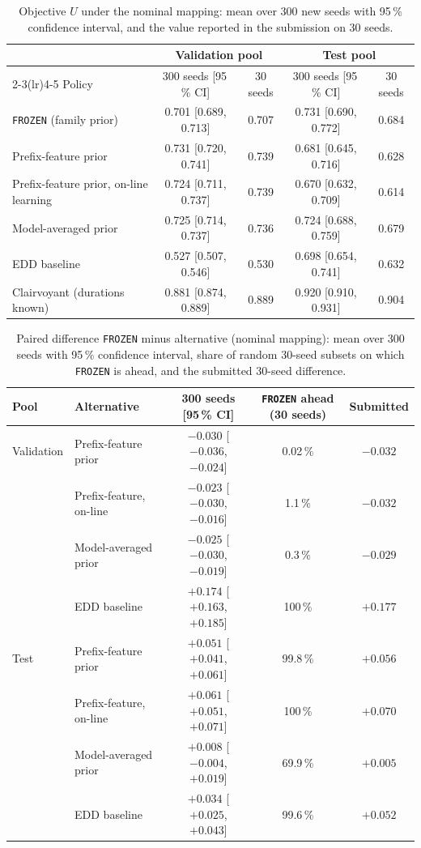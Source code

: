 \begin{table}[htbp]\centering\small\setlength{\tabcolsep}{4pt}
\caption{Objective $U$ under the nominal mapping: mean over 300 new seeds with 95\,\% confidence interval, and the value reported in the submission on 30 seeds.}\label{tab:sw-e1}
\begin{tabular}{lcccc}\toprule
 & \multicolumn{2}{c}{Validation pool} & \multicolumn{2}{c}{Test pool}\\\cmidrule(lr){2-3}\cmidrule(lr){4-5}
Policy & 300 seeds [95\,\% CI] & 30 seeds & 300 seeds [95\,\% CI] & 30 seeds\\\midrule
\texttt{FROZEN} (family prior) & 0.701 [0.689, 0.713] & 0.707 & 0.731 [0.690, 0.772] & 0.684\\
Prefix-feature prior & 0.731 [0.720, 0.741] & 0.739 & 0.681 [0.645, 0.716] & 0.628\\
Prefix-feature prior, on-line learning & 0.724 [0.711, 0.737] & 0.739 & 0.670 [0.632, 0.709] & 0.614\\
Model-averaged prior & 0.725 [0.714, 0.737] & 0.736 & 0.724 [0.688, 0.759] & 0.679\\
EDD baseline & 0.527 [0.507, 0.546] & 0.530 & 0.698 [0.654, 0.741] & 0.632\\
Clairvoyant (durations known) & 0.881 [0.874, 0.889] & 0.889 & 0.920 [0.910, 0.931] & 0.904\\\bottomrule
\end{tabular}
\end{table}

\begin{table}[htbp]\centering\small\setlength{\tabcolsep}{4pt}
\caption{Paired difference \texttt{FROZEN} minus alternative (nominal mapping): mean over 300 seeds with 95\,\% confidence interval, share of random 30-seed subsets on which \texttt{FROZEN} is ahead, and the submitted 30-seed difference.}\label{tab:sw-e1b}
\begin{tabular}{llccc}\toprule
Pool & Alternative & 300 seeds [95\,\% CI] & \texttt{FROZEN} ahead (30 seeds) & Submitted\\\midrule
Validation & Prefix-feature prior & $-0.030$ [$-0.036$, $-0.024$] & 0.02\,\% & $-0.032$\\
 & Prefix-feature, on-line & $-0.023$ [$-0.030$, $-0.016$] & 1.1\,\% & $-0.032$\\
 & Model-averaged prior & $-0.025$ [$-0.030$, $-0.019$] & 0.3\,\% & $-0.029$\\
 & EDD baseline & $+0.174$ [$+0.163$, $+0.185$] & 100\,\% & $+0.177$\\\midrule
Test & Prefix-feature prior & $+0.051$ [$+0.041$, $+0.061$] & 99.8\,\% & $+0.056$\\
 & Prefix-feature, on-line & $+0.061$ [$+0.051$, $+0.071$] & 100\,\% & $+0.070$\\
 & Model-averaged prior & $+0.008$ [$-0.004$, $+0.019$] & 69.9\,\% & $+0.005$\\
 & EDD baseline & $+0.034$ [$+0.025$, $+0.043$] & 99.6\,\% & $+0.052$\\\bottomrule
\end{tabular}
\end{table}

